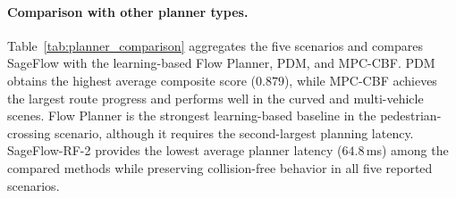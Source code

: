 \paragraph{Comparison with other planner types.}
Table~\ref{tab:planner_comparison} aggregates the five scenarios and
compares SageFlow with the learning-based Flow Planner, PDM, and
MPC-CBF.  PDM obtains the highest average composite score
(\(0.879\)), while MPC-CBF achieves the largest route progress and
performs well in the curved and multi-vehicle scenes.  Flow Planner is
the strongest learning-based baseline in the pedestrian-crossing
scenario, although it requires the second-largest planning latency.
SageFlow-RF-2 provides the lowest average planner
latency (\(64.8\)\,ms) among the compared methods while preserving
collision-free behavior in all five reported scenarios.

\begin{table}[t]
    \centering
    \small
    \setlength{\tabcolsep}{3pt}
    \caption{Aggregate comparison over the five closed-loop scenarios.
    Route is the mean expert-route progress ratio, CF is the number of
    collision-free scenarios out of five, and latency is measured on
    CPU.  The table reports controlled matched scenario runs and is
    not a statistical estimate over the full nuPlan benchmark.}
    \label{tab:planner_comparison}
\end{table}

